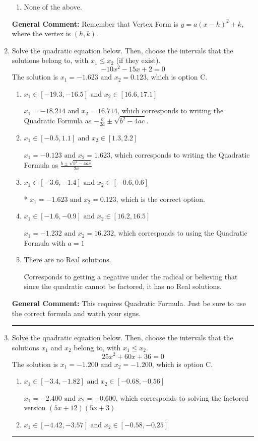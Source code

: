 \documentclass{extbook}[14pt]
\newcommand{\litem}[1]{\item #1

\rule{\textwidth}{0.4pt}}
\begin{document}
\begin{enumerate}
{\begin{enumerate}[label=\Alph*.]
\begin{multicols}{2}
\end{multicols}\item None of the above.\end{enumerate}
\textbf{General Comment:} Remember that Vertex Form is $y = a(x-h)^2+k$, where the vertex is $(h, k)$.
}
\litem{
Solve the quadratic equation below. Then, choose the intervals that the solutions belong to, with $x_1 \leq x_2$ (if they exist).
\[ -10x^{2} -15 x + 2 = 0 \]The solution is \( x_1 = -1.623 \text{ and } x_2 = 0.123 \), which is option C.\begin{enumerate}[label=\Alph*.]
\item \( x_1 \in [-19.3, -16.5] \text{ and } x_2 \in [16.6, 17.1] \)

 $x_1 = -18.214 \text{ and } x_2 = 16.714$, which corresponds to writing the Quadratic Formula as $-\frac{b}{2a} \pm \sqrt{b^2 - 4ac}$.
\item \( x_1 \in [-0.5, 1.1] \text{ and } x_2 \in [1.3, 2.2] \)

 $x_1 = -0.123 \text{ and } x_2 = 1.623$, which corresponds to writing the Quadratic Formula as $\frac{b \pm \sqrt{b^2 - 4ac}}{2a}$
\item \( x_1 \in [-3.6, -1.4] \text{ and } x_2 \in [-0.6, 0.6] \)

* $x_1 = -1.623 \text{ and } x_2 = 0.123$, which is the correct option.
\item \( x_1 \in [-1.6, -0.9] \text{ and } x_2 \in [16.2, 16.5] \)

 $x_1 = -1.232 \text{ and } x_2 = 16.232$, which corresponds to using the Quadratic Formula with $a=1$
\item \( \text{There are no Real solutions.} \)

Corresponds to getting a negative under the radical or believing that since the quadratic cannot be factored, it has no Real solutions.
\end{enumerate}

\textbf{General Comment:} This requires Quadratic Formula. Just be sure to use the correct formula and watch your signs.
}
\litem{
Solve the quadratic equation below. Then, choose the intervals that the solutions $x_1$ and $x_2$ belong to, with $x_1 \leq x_2$.
\[ 25x^{2} +60 x + 36 = 0 \]The solution is \( x_1 = -1.200 \text{ and } x_2 = -1.200 \), which is option C.\begin{enumerate}[label=\Alph*.]
\item \( x_1 \in [-3.4, -1.82] \text{ and } x_2 \in [-0.68, -0.56] \)

$x_1 = -2.400 \text{ and } x_2 = -0.600$, which corresponds to solving the factored version $(5x + 12)(5x + 3)$
\item \( x_1 \in [-4.42, -3.57] \text{ and } x_2 \in [-0.58, -0.25] \)


\end{enumerate}}
\end{enumerate}
\end{document}
